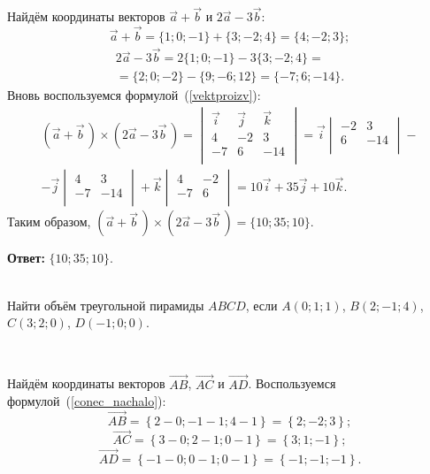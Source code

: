 \documentclass[10pt]{article}
\numberwithin{primer}{section}
\numberwithin{equation}{section}
\begin{document}
Найдём координаты векторов $\vec{a}+\vec{b}$ и $2\vec{a}-3\vec{b}$:
\[
\vec{a}+\vec{b}=\{1;0;-1\}+\{3;-2;4\}=\{4;-2;3\};
\]
\begin{multline*}
2\vec{a}-3\vec{b}=2\{1;0;-1\}-3\{3;-2;4\}=\\=\{2;0;-2\}-\{9;-6;12\}=\{-7;6;-14\}.
\end{multline*}
Вновь воспользуемся формулой~(\ref{vektproizv}):
\begin{multline*}
(\vec{a}+\vec{b}\,)\times(2\vec{a}-3\vec{b}\,)=\begin{vmatrix}
\vec{i} & \vec{j} & \vec{k}\\
4 & -2 & 3\\
-7 & 6 & -14\\
\end{vmatrix}=\vec{i}\begin{vmatrix}
-2 & 3\\
6 & -14\\
\end{vmatrix}-\\-\vec{j}\begin{vmatrix}
4 & 3\\
-7 & -14\\
\end{vmatrix}+\vec{k}\begin{vmatrix}
4 & -2\\
-7 & 6\\
\end{vmatrix}=10\vec{i}+35\vec{j}+10\vec{k}.
\end{multline*}
Таким образом, $(\vec{a}+\vec{b}\,)\times(2\vec{a}-3\vec{b}\,)=\{10;35;10\}$.

\noindent\textbf{Ответ: }$\{10;35;10\}$.\vspace{4pt}

\noindent\hrulefill\,\,\hrulefill\vspace{4pt}\\
Найти объём треугольной пирамиды $ABCD$, если $A(0;1;1)$, $B(2;-1;4)$, $C(3;2;0)$, $D(-1;0;0)$.

\noindent{}\,\hrulefill\vspace{4pt}

Найдём координаты векторов $\overrightarrow{AB}$, $\overrightarrow{AC}$ и $\overrightarrow{AD}$. Воспользуемся формулой~(\ref{conec_nachalo}):
\[
\overrightarrow{AB}=\left\{2-0;-1-1;4-1\right\}=\left\{2;-2;3\right\};
\]
\[
\overrightarrow{AC}=\left\{3-0;2-1;0-1\right\}=\left\{3;1;-1\right\};
\]
\[
\overrightarrow{AD}=\left\{-1-0;0-1;0-1\right\}=\left\{-1;-1;-1\right\}.
\]
\end{document}
